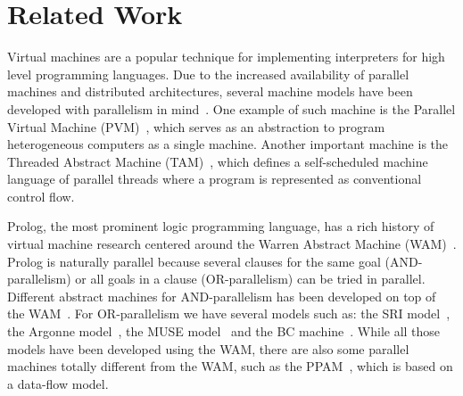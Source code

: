 \section{Related Work}
\label{related_work}

Virtual machines are a popular technique for implementing interpreters
for high level programming languages.  Due to the increased
availability of parallel machines and distributed architectures,
several machine models have been developed with parallelism in
mind~\cite{Kara:1997:AMM:265274}.  One example of such machine is the
Parallel Virtual Machine (PVM)~\cite{Sunderam90pvm:a}, which serves as
an abstraction to program heterogeneous computers as a single
machine. Another important machine is the Threaded Abstract Machine
(TAM)~\cite{CullerGSvE93,goldstein-tr94}, which defines a
self-scheduled machine language of parallel threads where a program is
represented as conventional control flow.

Prolog, the most prominent logic programming language, has a rich
history of virtual machine research centered around the Warren
Abstract Machine (WAM)~\cite{AICPub641:1983}. 
Prolog is naturally parallel because several clauses for the same goal
(AND-parallelism) or all goals in a clause (OR-parallelism) can be
tried in parallel. Different abstract machines for AND-parallelism has
been developed on top of the
WAM~\cite{Hermenegildo:1986:AMB:913061,Lin:1988:AEL:900478}.  For
OR-parallelism we have several models such as: the SRI
model~\cite{Warren:1987:OEM:67683.67699}, the Argonne
model~\cite{ButlerDLOOS88}, the MUSE model~\cite{Ali:1990fk} and the
BC machine~\cite{Ali88}. While all those models have been developed
using the WAM, there are also some parallel machines totally different
from the WAM, such as the PPAM~\cite{Kacsuk:1990:EMP:533578}, which is
based on a data-flow model.
